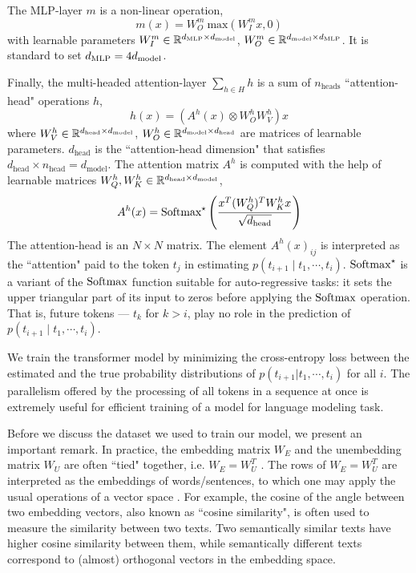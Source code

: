 The MLP-layer $m$ is a non-linear operation, 
\[
m(x) =W^m_O \ \text{max}(W_I^m x, 0)
\]
with learnable parameters $W^m_I \in \mathbb{R}^{d_{\text{MLP}} \times d_{\text{model}}}$, $W^m_O \in \mathbb{R}^{d_{\text{model}} \times d_{\text{MLP}}}$. It is standard to set $d_{\text{MLP}} = 4 d_{\text{model}}$.

Finally, the multi-headed attention-layer $\sum_{h \in H} h$ is a sum of $n_{\text{heads}}$ ``attention-head" operations $h$, 
\[
h(x) = (A^h(x) \otimes W^h_O W^h_V) x
\]
where $W^h_V \in \mathbb{R}^{d_{\text{head}} \times d_{\text{model}}}$, 
$W^h_O \in \mathbb{R}^{d_{\text{model}} \times d_{\text{head}}}$ 
are matrices of learnable parameters. 
$d_{\text{head}}$ is the ``attention-head dimension" that satisfies $d_{\text{head}} \times n_{\text{head}} = d_{\text{model}}$. 
The attention matrix $A^h$ is computed with the help of learnable matrices 
$W^h_Q, W^h_K \in \mathbb{R}^{d_{\text{head}} \times d_{\text{model}}}$,
\[
A^h(x) = \text{Softmax}^\star \left(\frac{x^T (W^h_Q)^T W^h_K x}{\sqrt{d_{\text{head}}}}\right)
\] 
The attention-head is an $N \times N$ matrix. The element $A^h(x)_{ij}$ 
is interpreted as the ``attention" paid to the token 
$t_j$ in estimating 
$p(t_{i+1} \mid t_1, \cdots, t_i)$. $\text{Softmax}^\star$
is a variant of the $\text{Softmax}$ function suitable for auto-regressive tasks: it sets the upper triangular part of its input to zeros before applying the 
$\text{Softmax}$ operation. 
That is, future tokens --- $t_k$ for $k > i$, play no role in the prediction of $p(t_{i+1} \mid t_1, \cdots, t_i)$.

We train the transformer model by minimizing the cross-entropy loss between the estimated and the true probability distributions of $p(t_{i+1} | t_1, \cdots, t_{i})$ for all $i$. The parallelism offered by the processing of all tokens in a sequence at once is extremely useful for efficient training of a model for language modeling task.

Before we discuss the dataset we used to train our model, we present an important remark. In practice, the embedding matrix $W_E$ and the unembedding matrix $W_U$ are often ``tied" together, i.e. $W_E = W_U^T$ \cite{press2017using, inan2017tying}.
The rows of $W_E = W_U^T$ are interpreted as the embeddings of words/sentences, to which one may apply the usual operations of a vector space \cite{Bengio:2003, mikolov-etal-2013-linguistic}. 
For example, the cosine of the angle between two embedding vectors, also known as ``cosine similarity", is often used to measure the similarity between two texts. 
Two semantically similar texts have higher cosine similarity between them, while semantically different texts correspond to (almost) orthogonal vectors in the embedding space.


